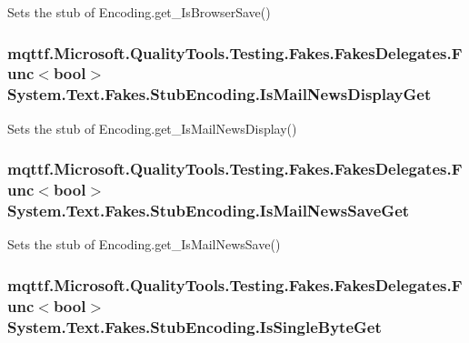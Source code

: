 Sets the stub of Encoding.\-get\-\_\-\-Is\-Browser\-Save()

\hypertarget{class_system_1_1_text_1_1_fakes_1_1_stub_encoding_afe1778a77114dbafae806636acfd313c}{
\subsubsection[{Is\-Mail\-News\-Display\-Get}]{\setlength{\rightskip}{0pt plus 5cm}mqttf.\-Microsoft.\-Quality\-Tools.\-Testing.\-Fakes.\-Fakes\-Delegates.\-Func$<$bool$>$ System.\-Text.\-Fakes.\-Stub\-Encoding.\-Is\-Mail\-News\-Display\-Get}}\label{class_system_1_1_text_1_1_fakes_1_1_stub_encoding_afe1778a77114dbafae806636acfd313c}


Sets the stub of Encoding.\-get\-\_\-\-Is\-Mail\-News\-Display()

\hypertarget{class_system_1_1_text_1_1_fakes_1_1_stub_encoding_ac2d11985c3580f7651f45f0856528eac}{
\subsubsection[{Is\-Mail\-News\-Save\-Get}]{\setlength{\rightskip}{0pt plus 5cm}mqttf.\-Microsoft.\-Quality\-Tools.\-Testing.\-Fakes.\-Fakes\-Delegates.\-Func$<$bool$>$ System.\-Text.\-Fakes.\-Stub\-Encoding.\-Is\-Mail\-News\-Save\-Get}}\label{class_system_1_1_text_1_1_fakes_1_1_stub_encoding_ac2d11985c3580f7651f45f0856528eac}


Sets the stub of Encoding.\-get\-\_\-\-Is\-Mail\-News\-Save()

\hypertarget{class_system_1_1_text_1_1_fakes_1_1_stub_encoding_aac499d277cd63f8b0850d36080d636b7}{
\subsubsection[{Is\-Single\-Byte\-Get}]{\setlength{\rightskip}{0pt plus 5cm}mqttf.\-Microsoft.\-Quality\-Tools.\-Testing.\-Fakes.\-Fakes\-Delegates.\-Func$<$bool$>$ System.\-Text.\-Fakes.\-Stub\-Encoding.\-Is\-Single\-Byte\-Get}}\label{class_system_1_1_text_1_1_fakes_1_1_stub_encoding_aac499d277cd63f8b0850d36080d636b7}


